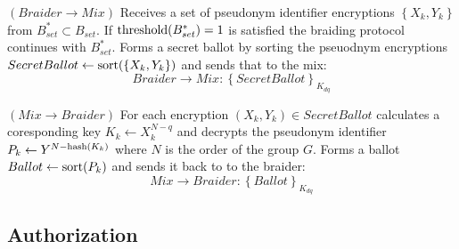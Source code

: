 \documentclass[12pt]{article}
\begin{document}
\begin{steps}
\item $(Braider \to Mix)$ Receives a set of pseudonym identifier encryptions $\left\{ X_k, Y_k \right\}$ from $B^*_{set} \subset B_{set}$. If ${\rm threshold}(B^*_{set})=1$ is satisfied the braiding protocol continues with $B^*_{set}$. Forms a secret ballot by sorting the pseuodnym encryptions $SecretBallot \leftarrow {\rm sort}(\left\{ X_k, Y_k \right\})$ and sends that to the mix:
  \begin{equation}
    Braider \to Mix: \left\{ SecretBallot  \right\}_{K_{dq}}
  \end{equation}

\item $(Mix \to Braider)$ For each encryption $(X_k, Y_k) \in SecretBallot$ calculates a coresponding key $K_k \leftarrow X_k^{N - q}$ and decrypts the pseudonym identifier $P_k \leftarrow Y^{N - {\rm hash}(K_k)}$ where $N$ is the order of the group $G$. Forms a ballot $Ballot \leftarrow {\rm sort}(P_k)$ and sends it back to to the braider:
  \begin{equation}
    Mix \to Braider: \left\{ Ballot \right\}_{K_{dq}}
  \end{equation}
  
\end{steps}

\subsection*{Authorization}
\end{document}
